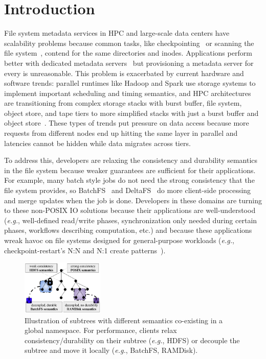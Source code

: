 \section{Introduction}

File system metadata services in HPC and large-scale data centers have
scalability problems because common tasks, like
checkpointing~\cite{bent_plfs_2009} or scanning the file
system~\cite{zheng:pdsw2014-batchfs}, contend for the same directories and
inodes. Applications perform better with dedicated metadata
servers~\cite{sevilla:sc15-mantle, ren:sc2014-indexfs} but provisioning a
metadata server for every  is unreasonable. This problem is
exacerbated by current hardware and software trends: parallel runtimes like
Hadoop and Spark use storage systems to implement important scheduling and
timing semantics, and   HPC architectures are
transitioning from complex storage stacks with burst buffer, file system,
object store, and tape tiers to more simplified stacks with just a burst buffer
and object store~\cite{bent:login16-hpc-trends}. These types of trends put
pressure on data access because more requests from different nodes end up
hitting the same layer in parallel and latencies cannot be hidden while data
migrates across tiers.

To address this, developers are relaxing the consistency and durability
semantics in the file system because weaker guarantees are sufficient for their
applications. For example, many batch style jobs do not need the strong
consistency that the file system provides, so
BatchFS~\cite{zheng:pdsw2014-batchfs} and DeltaFS~\cite{zheng:pdsw2015-deltafs}
do more client-side processing and merge updates when the job is done.
Developers in these domains are turning to these non-POSIX IO solutions because
their applications are well-understood ({\it e.g.}, well-defined read/write
phases, synchronization only needed during certain phases, workflows describing
computation, etc.) and because these applications wreak havoc on file systems
designed for general-purpose workloads ({\it e.g.}, checkpoint-restart's N:N
and N:1 create patterns~\cite{bent_plfs_2009}).

\begin{figure}[tb] \centering
\includegraphics[width=0.35\textwidth]{figures/subtree-policies1.png}
\caption{Illustration of subtrees with different semantics co-existing in a
global namespace.  For performance, clients  relax consistency/durability on their
subtree ({\it e.g.}, HDFS) or decouple the subtree and move it locally ({\it e.g.}, BatchFS, RAMDisk).
}\label{fig:subtree-policies} \end{figure}

